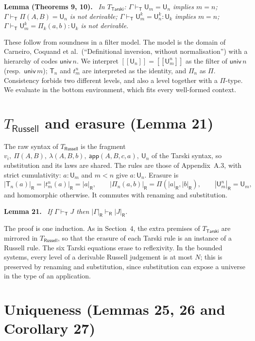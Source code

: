 \documentclass[11pt]{article}
\newenvironment{lemma}[1]{\par\medskip\noindent\textbf{Lemma #1.}\ \itshape}{\par\medskip}
\theoremstyle{definition}
\theoremstyle{remark}
\newcommand{\vdashT}{\vdash_{\mathsf T}}
\newcommand{\U}{\mathsf U}
\newcommand{\T}{\mathsf T}
\newcommand{\app}{\mathsf{app}}
\newcommand{\ev}[2]{[\![#1]\!]#2}
\newcommand{\vdashR}{\vdash_{\mathsf R}}
\newcommand{\erR}[1]{|#1|_{\mathsf R}}
\begin{document}
\begin{lemma}{(Theorems 9, 10)}
In $T_{\mathsf{Tarski}}$:
$\Gamma\vdashT\U_m=\U_n$ implies $m=n$;
$\Gamma\vdashT\Pi(A,B)=\U_n$ is not derivable;
$\Gamma\vdashT\U^k_m=\U^k_n:\U_k$ implies $m=n$;
$\Gamma\vdashT\U^k_m=\Pi_k(a,b):\U_k$ is not derivable.
\end{lemma}
These follow from soundness in a filter model. The model is the domain of
Carneiro, Coquand et al.\ (``Definitional inversion, without normalisation'')
with a hierarchy of codes $\mathsf{univ}\,n$. We interpret
$\ev{\U_n}{}=\ev{\U^n_m}{}$ as the filter of $\mathsf{univ}\,n$
(resp.\ $\mathsf{univ}\,m$); $\T_n$ and $t^n_m$ are interpreted as the
identity, and $\Pi_n$ as $\Pi$. Consistency forbids two different levels,
and also a level together with a $\Pi$-type. We evaluate in the bottom
environment, which fits every well-formed context.

\section{$T_{\mathsf{Russell}}$ and erasure (Lemma 21)}

The raw syntax of $T_{\mathsf{Russell}}$ is the fragment
$v_i,\ \Pi(A,B),\ \lambda(A,B,b),\ \app(A,B,c,a),\ \U_n$ of the Tarski
syntax, so substitution and its laws are shared. The rules are those of
Appendix~A.3, with strict cumulativity: $a:\U_m$ and $m<n$ give $a:\U_n$.
Erasure is
\[
\erR{\T_n(a)}=\erR{t^n_m(a)}=\erR a,\qquad
\erR{\Pi_n(a,b)}=\Pi(\erR a,\erR b),\qquad
\erR{\U^n_m}=\U_m,
\]
and homomorphic otherwise. It commutes with renaming and substitution.

\begin{lemma}{21}
If $\Gamma\vdashT J$ then $\erR\Gamma\vdashR\erR J$.
\end{lemma}
The proof is one induction. As in Section~4, the extra premises of
$T_{\mathsf{Tarski}}$ are mirrored in $T_{\mathsf{Russell}}$, so that the
erasure of each Tarski rule is an instance of a Russell rule. The six Tarski
equations erase to reflexivity. In the bounded systems, every level of a
derivable Russell judgement is at most $N$; this is preserved by renaming
and substitution, since substitution can expose a universe in the type of
an application.

\section{Uniqueness (Lemmas 25, 26 and Corollary 27)}
\end{document}
